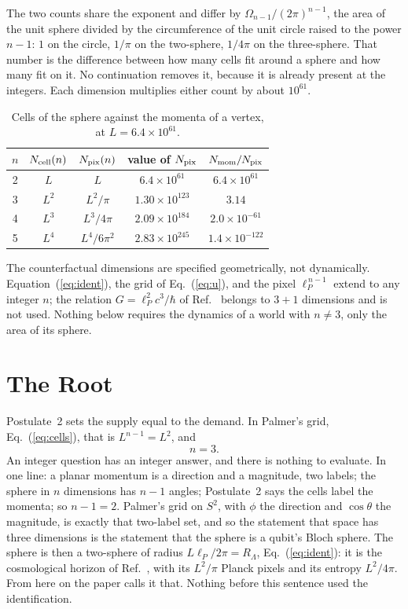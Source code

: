 \documentclass[aps,prd,twocolumn,superscriptaddress,nofootinbib]{revtex4-2}
\begin{document}
The two counts share the exponent and differ by $\Omega_{n-1}/(2\pi)^{n-1}$, the area of the unit sphere divided by the circumference of the unit circle raised to the power $n-1$: $1$ on the circle, $1/\pi$ on the two-sphere, $1/4\pi$ on the three-sphere. That number is the difference between how many cells fit around a sphere and how many fit on it. No continuation removes it, because it is already present at the integers. Each dimension multiplies either count by about $10^{61}$.

\begin{table}[t]
\caption{Cells of the sphere against the momenta of a vertex, at $L = 6.4\times10^{61}$.}
\label{tab:count}
\begin{ruledtabular}
\begin{tabular}{ccccc}
$n$ & $N_{\rm cell}(n)$ & $N_{\rm pix}(n)$ & value of $N_{\rm pix}$ & $N_{\rm mom}/N_{\rm pix}$ \\
\hline
2 & $L$ & $L$ & $6.4\times10^{61}$ & $6.4\times10^{61}$ \\
3 & $L^2$ & $L^2/\pi$ & $1.30\times10^{123}$ & $3.14$ \\
4 & $L^3$ & $L^3/4\pi$ & $2.09\times10^{184}$ & $2.0\times10^{-61}$ \\
5 & $L^4$ & $L^4/6\pi^2$ & $2.83\times10^{245}$ & $1.4\times10^{-122}$ \\
\end{tabular}
\end{ruledtabular}
\end{table}

The counterfactual dimensions are specified geometrically, not dynamically. Equation~(\ref{eq:ident}), the grid of Eq.~(\ref{eq:u}), and the pixel $\ell_P^{\,n-1}$ extend to any integer $n$; the relation $G = \ell_P^2c^3/\hbar$ of Ref.~\cite{korytko2026} belongs to $3+1$ dimensions and is not used. Nothing below requires the dynamics of a world with $n \ne 3$, only the area of its sphere.

\section{The Root}
\label{sec:root}

Postulate~2 sets the supply equal to the demand. In Palmer's grid, Eq.~(\ref{eq:cells}), that is $L^{n-1} = L^2$, and
\begin{equation}
n = 3 .
\label{eq:exact}
\end{equation}
An integer question has an integer answer, and there is nothing to evaluate. In one line: a planar momentum is a direction and a magnitude, two labels; the sphere in $n$ dimensions has $n-1$ angles; Postulate~2 says the cells label the momenta; so $n-1 = 2$. Palmer's grid on $S^2$, with $\phi$ the direction and $\cos\theta$ the magnitude, is exactly that two-label set, and so the statement that space has three dimensions is the statement that the sphere is a qubit's Bloch sphere. The sphere is then a two-sphere of radius $L\ell_P/2\pi = R_\Lambda$, Eq.~(\ref{eq:ident}): it is the cosmological horizon of Ref.~\cite{korytko2026}, with its $L^2/\pi$ Planck pixels and its entropy $L^2/4\pi$. From here on the paper calls it that. Nothing before this sentence used the identification.
\end{document}
